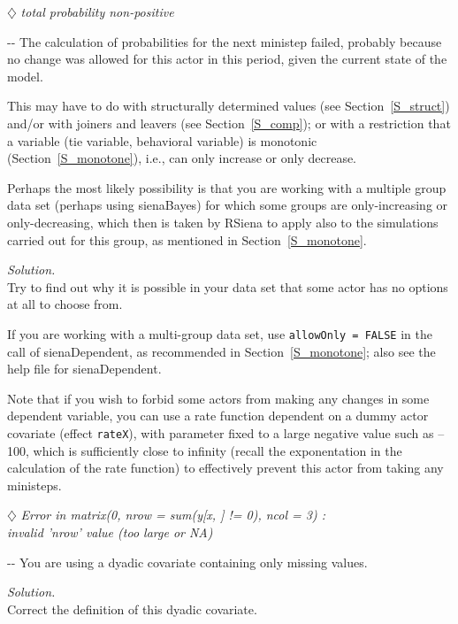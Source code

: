 \documentclass[a4paper,fleqn,11pt]{article}
\makeatletter
\newcommand{\+}{\, + \,}
\newcommand{\sfn}[1]{\textsf{#1}}
\newcommand{\RS}{{\sf RSiena }}
\newenvironment{indentation}[2]
{\par \setlength{\leftmargin}{#1}       \setlength{\rightmargin}{#2}
  \advance\linewidth -\leftmargin       \advance\linewidth -\rightmargin
  \advance\@totalleftmargin\leftmargin  \@setpar{{\@@par}}%
  \parshape 1 \@totalleftmargin         \linewidth \ignorespaces}{\par}
\makeatother
\begin{document}
\noindent $\diamondsuit$ \emph{total probability non-positive}\\
\smallskip

\begin{indentation}{0.04\textwidth}{0pt}
\noindent
The calculation of probabilities for the next ministep failed,
probably because no change was allowed for this actor in this period,
given the current state of the model.

This may have to do with structurally determined values
(see Section~\ref{S_struct})
and/or with joiners and leavers (see Section~\ref{S_comp});
or with a restriction that a variable (tie variable, behavioral variable)
is monotonic (Section~\ref{S_monotone}), i.e., can only
increase or only decrease.

Perhaps the most likely possibility is that you are working with a
multiple group data set (perhaps using \sfn{sienaBayes})
for which some groups are only-increasing or only-decreasing,
which then is taken by \RS to apply also to the simulations carried
out for this group, as mentioned in Section~\ref{S_monotone}.
\smallskip

\noindent
\emph{Solution.} \\
Try to find out why it is possible in your data set
that some actor has no options at all to choose from.

If you are working with a multi-group data set, use
\texttt{allowOnly = FALSE} in the call of \sfn{sienaDependent},
as recommended in Section~\ref{S_monotone}; also see the help file for
\sfn{sienaDependent}.

Note that if you wish to forbid some actors from making any changes
in some dependent variable, you can use a rate function dependent
on a dummy actor covariate (effect \texttt{rateX}), with parameter fixed
to a large negative value such as --100, which is sufficiently close to
infinity (recall the exponentation in the calculation of the rate function)
to effectively prevent this actor from taking any ministeps.
\end{indentation}
\bigskip

\noindent $\diamondsuit$ \emph{
Error in matrix(0, nrow = sum(y[x, ] != 0), ncol = 3) :\\
  invalid 'nrow' value (too large or NA) }
\smallskip

\begin{indentation}{0.04\textwidth}{0pt}
\noindent
You are using a dyadic covariate containing only missing values.
\smallskip

\noindent
\emph{Solution.} \\
Correct the definition of this dyadic covariate.
\end{indentation}
\bigskip
\end{document}
